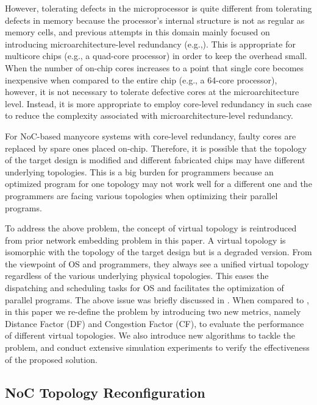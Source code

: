 However, tolerating defects in the microprocessor is quite different from tolerating defects in memory because the processor’s internal structure is not as regular as memory cells, and previous attempts in this domain mainly focused on introducing microarchitecture-level redundancy (e.g.,\cite{shivakumar2003exploiting,schuchman2005rescue}). This is appropriate for multicore chips (e.g., a quad-core processor) in order to keep the overhead small. When the number of on-chip cores increases to a point that single core becomes inexpensive when compared to the entire chip (e.g., a 64-core processor), however, it is not necessary to tolerate defective cores at the microarchitecture level. Instead, it is more appropriate to employ core-level redundancy in such case to reduce the complexity associated with microarchitecture-level redundancy.

For NoC-based manycore systems with core-level redundancy, faulty cores are replaced by spare ones placed on-chip. Therefore, it is possible that the topology of the target design is modified and different fabricated chips may have different underlying topologies. This is a big burden for programmers because an optimized program for one topology may not work well for a different one and the programmers are facing various topologies when optimizing their parallel programs.

To address the above problem, the concept of virtual topology is reintroduced from prior network embedding problem in this paper. A virtual topology is isomorphic with the topology of the target design but is a degraded version. From the viewpoint of OS and programmers, they always see a unified virtual topology regardless of the various underlying physical topologies. This eases the dispatching and scheduling tasks for OS and facilitates the optimization of parallel programs. The above issue was briefly discussed in \cite{zhang2007fault}. When compared to \cite{zhang2007fault}, in this paper we re-define the problem by introducing two new metrics, namely Distance Factor (DF) and Congestion Factor (CF), to evaluate the performance of different virtual topologies. We also introduce new algorithms to tackle the problem, and conduct extensive simulation experiments to verify the effectiveness of the proposed solution.

\subsection{NoC Topology Reconfiguration}
